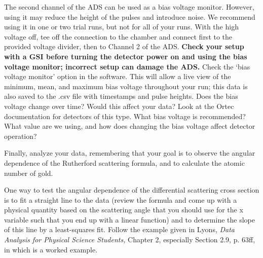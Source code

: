 \documentclass{../lab}
\begin{document}
The second channel of the ADS can be used as a bias voltage monitor. However, using it may reduce the height of the pulses and introduce noise. We recommend using it in one or two trial runs, but not for all of your runs. With the high voltage off, tee off the connection to the chamber and connect first to the provided voltage divider, then to Channel 2 of the ADS. \textbf{Check your setup with a GSI before turning the detector power on and using the bias voltage monitor; incorrect setup can damage the ADS.} Check the `bias voltage monitor' option in the software. This will allow a live view of the minimum, mean, and maximum bias voltage throughout your run; this data is also saved to the .csv file with timestamps and pulse heights. Does the bias voltage change over time? Would this affect your data? Look at the Ortec documentation for detectors of this type. What bias voltage is recommended? What value are we using, and how does changing the bias voltage affect detector operation?




Finally, analyze your data, remembering that your goal is to observe the angular dependence of the Rutherford scattering formula, and to calculate the atomic number of gold.

One way to test the angular dependence of the differential scattering cross section is to fit a straight line to the data (review the formula and come up with a physical quantity based on the scattering angle that you should use for the x variable such that you end up with a linear function) and to determine the slope of this line by a least-squares fit. Follow the example given in Lyons, \emph{Data Analysis for Physical Science Students,} Chapter 2, especially Section 2.9, p. 63ff, in which is a worked example.
\end{document}
